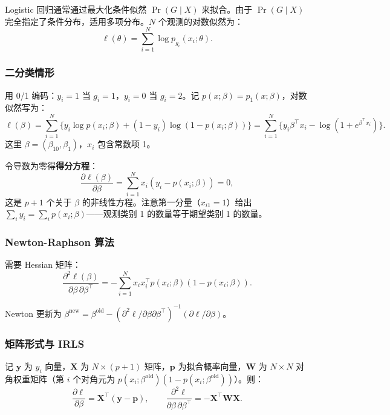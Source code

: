 Logistic 回归通常通过最大化条件似然 $\Pr(G \mid X)$ 来拟合。由于 $\Pr(G \mid X)$ 完全指定了条件分布，适用多项分布。$N$ 个观测的对数似然为：
\begin{equation}\label{eq:multiloglik}
    \ell(\theta) = \sum_{i=1}^{N} \log p_{g_i}(x_i; \theta).
\end{equation}

\subsubsection{二分类情形}

用 0/1 编码：$y_i = 1$ 当 $g_i = 1$，$y_i = 0$ 当 $g_i = 2$。记 $p(x; \beta) = p_1(x; \beta)$，对数似然写为：
\begin{equation}\label{eq:binomial_loglik}
    \ell(\beta) = \sum_{i=1}^{N} \Big\{ y_i \log p(x_i; \beta) + (1 - y_i) \log(1 - p(x_i; \beta)) \Big\}
    = \sum_{i=1}^{N} \Big\{ y_i \beta^\top x_i - \log(1 + e^{\beta^\top x_i}) \Big\}.
\end{equation}
这里 $\beta = (\beta_{10}, \beta_1)$，$x_i$ 包含常数项 1。

令导数为零得\textbf{得分方程}：
\begin{equation}\label{eq:score_eq}
    \frac{\partial \ell(\beta)}{\partial \beta} = \sum_{i=1}^{N} x_i (y_i - p(x_i; \beta)) = 0,
\end{equation}
这是 $p+1$ 个关于 $\beta$ 的非线性方程。注意第一分量（$x_{i1}=1$）给出 $\sum_i y_i = \sum_i p(x_i; \beta)$——观测类别 1 的数量等于期望类别 1 的数量。

\subsubsection{Newton-Raphson 算法}

需要 Hessian 矩阵：
\begin{equation}\label{eq:hessian}
    \frac{\partial^2 \ell(\beta)}{\partial\beta\,\partial\beta^\top}
    = -\sum_{i=1}^{N} x_i x_i^\top p(x_i; \beta)(1 - p(x_i; \beta)).
\end{equation}

Newton 更新为 $\beta^{\mathrm{new}} = \beta^{\mathrm{old}} - (\partial^2\ell/\partial\beta\partial\beta^\top)^{-1} (\partial\ell/\partial\beta)$。

\subsubsection{矩阵形式与 IRLS}

记 $\mathbf{y}$ 为 $y_i$ 向量，$\mathbf{X}$ 为 $N \times (p+1)$ 矩阵，$\mathbf{p}$ 为拟合概率向量，$\mathbf{W}$ 为 $N \times N$ 对角权重矩阵（第 $i$ 个对角元为 $p(x_i; \beta^{\mathrm{old}})(1 - p(x_i; \beta^{\mathrm{old}}))$）。则：
\[
\frac{\partial\ell}{\partial\beta} = \mathbf{X}^\top (\mathbf{y} - \mathbf{p}), \qquad
\frac{\partial^2\ell}{\partial\beta\,\partial\beta^\top} = -\mathbf{X}^\top \mathbf{W} \mathbf{X}.
\]

